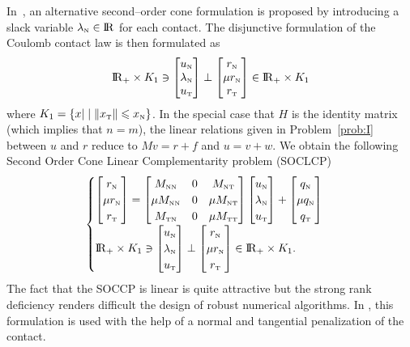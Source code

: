In~\cite{Kanno.ea2006},  an alternative second--order cone formulation is proposed by introducing a slack variable $\lambda_{\hbox{\tiny{N}}}\in\mathrm{I\!R}$ for each contact. The disjunctive formulation of the Coulomb contact law is then formulated as
\begin{equation}
  \label{eq:kanno}
    \RR_+\times K_1 \ni
    \begin{bmatrix}
     u_\n \\ \lambda_\n \\  u_{\t}
    \end{bmatrix}
    \perp
    \begin{bmatrix}
     r_\n\\ \mu r_\n \\ r_{\t}
    \end{bmatrix}
    \in \RR_+ \times K_1
\end{equation}
where $K_1 =\{x | \mid  \|x_{\hbox{\tiny{T}}}\| \leqslant x_{\hbox{\tiny{N}}}  \}$. In the special case that $H$ is the identity matrix (which implies that $n=m$), the linear relations given in Problem~\ref{prob:I} between $u$ and $r$ reduce to $Mv = r +f$ and $u = v+w $. We obtain the following Second Order Cone Linear Complementarity problem (SOCLCP)
\begin{equation}
  \label{eq:kanno1}
  \begin{cases}
    \begin{bmatrix}
      r_\n\\ \mu r_\n \\ r_{\t}
    \end{bmatrix} =
    \begin{bmatrix}
      M_{\n\n} & 0 & M_{\n\t} \\
      \mu M_{\n\n} & 0 & \mu M_{\n\t} \\
      M_{\t\n} & 0 & \mu M_{\t\t} \\
    \end{bmatrix}
    \begin{bmatrix}
      u_\n \\ \lambda_\n \\ u_{\t}
    \end{bmatrix} +
    \begin{bmatrix}
      q_\n \\ \mu q_\n \\ q_{\t}
    \end{bmatrix}
    \\
    \RR_+\times K_1 \ni
    \begin{bmatrix}
     u_\n \\ \lambda_\n \\  u_{\t}
    \end{bmatrix}
    \perp
    \begin{bmatrix}
     r_\n\\ \mu r_\n \\ r_{\t}
    \end{bmatrix}
    \in \RR_+ \times K_1.
  \end{cases}
\end{equation}
The fact that the SOCCP is linear is quite attractive but the strong rank deficiency renders difficult the design of robust numerical algorithms. In \cite{Zhang.ea_CMAME2011}, this formulation is used with the help of a normal and tangential penalization of the contact.


